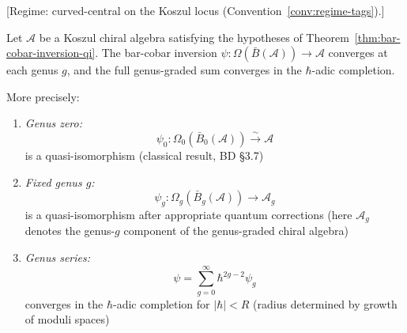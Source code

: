 \begin{theorem}\label{thm:genus-graded-convergence}
\textup{[Regime: curved-central on the Koszul locus
\textup{(}Convention~\textup{\ref{conv:regime-tags})}.]}

Let $\mathcal{A}$ be a Koszul chiral algebra satisfying the hypotheses of
Theorem~\ref{thm:bar-cobar-inversion-qi}.  The bar-cobar inversion
$\psi: \Omega(\bar{B}(\mathcal{A})) \to \mathcal{A}$
converges at each genus $g$, and the full genus-graded sum converges in the
$\hbar$-adic completion.

More precisely:
\begin{enumerate}
\item \emph{Genus zero:} 
      \[\psi_0: \Omega_0(\bar{B}_0(\mathcal{A})) \xrightarrow{\sim} \mathcal{A}\]
      is a quasi-isomorphism (classical result, BD §3.7)
      
\item \emph{Fixed genus $g$:}
      \[\psi_g: \Omega_g(\bar{B}_g(\mathcal{A})) \to \mathcal{A}_g\]
      is a quasi-isomorphism after appropriate quantum corrections (here $\mathcal{A}_g$ denotes the genus-$g$ component of the genus-graded chiral algebra)
      
\item \emph{Genus series:}
      \[\psi = \sum_{g=0}^\infty \hbar^{2g-2} \psi_g\]
      converges in the $\hbar$-adic completion for $|\hbar| < R$ (radius determined 
      by growth of moduli spaces)
\end{enumerate}
\end{theorem}

